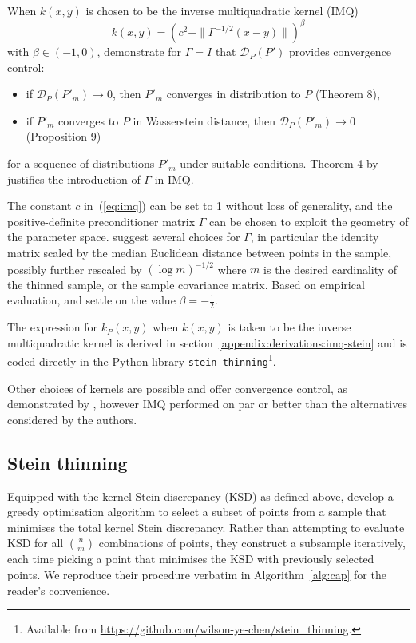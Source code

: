 \documentclass[11pt,a4paper]{report}
\begin{document}
When $k(x, y)$ is chosen to be the inverse multiquadratic kernel (IMQ)
\begin{equation}
k(x, y) = \left(c^2 + \|\Gamma^{-1/2}(x-y)\|\right)^\beta
\label{eq:imq}
\end{equation}
with $\beta \in (-1, 0)$, \cite{gorhamMeasuringSampleQuality2017} demonstrate for $\Gamma = I$ that $\mathcal{D}_{P}(P')$ provides convergence control:
\begin{itemize}
\item if $\mathcal{D}_{P}(P'_m) \to 0$, then $P'_m$ converges in distribution to $P$ (Theorem 8),
\item if $P'_m$ converges to $P$ in Wasserstein distance, then $\mathcal{D}_{P}(P'_m) \to 0$ (Proposition 9)
\end{itemize}
for a sequence of distributions $P'_m$ under suitable conditions. Theorem 4 by \cite{chenSteinPointMarkov2019} justifies the introduction of $\Gamma$ in IMQ.

The constant $c$ in~(\ref{eq:imq}) can be set to 1 without loss of generality, and the positive-definite preconditioner matrix $\Gamma$ can be chosen to exploit the geometry of the parameter space. \cite{riabizOptimalThinningMCMC2022} suggest several choices for $\Gamma$, in particular the identity matrix scaled by the median Euclidean distance between points in the sample, possibly further rescaled by $(\log m)^{-1/2}$ where $m$ is the desired cardinality of the thinned sample, or the sample covariance matrix. Based on empirical evaluation, \cite{gorhamMeasuringSampleQuality2017} and \cite{riabizOptimalThinningMCMC2022} settle on the value $\beta = -\frac12$.

The expression for $k_P(x, y)$ when $k(x, y)$ is taken to be the inverse multiquadratic kernel is derived in section~\ref{appendix:derivations:imq-stein} and is coded directly in the Python library \texttt{stein-thinning}\footnote{Available from \url{https://github.com/wilson-ye-chen/stein_thinning}.}.

Other choices of kernels are possible and offer convergence control, as demonstrated by \cite{chenSteinPoints2018}, however IMQ performed on par or better than the alternatives considered by the authors.

\subsection{Stein thinning}
\label{sec:stein-thinning}

Equipped with the kernel Stein discrepancy (KSD) as defined above, \cite{riabizOptimalThinningMCMC2022} develop a greedy optimisation algorithm to select a subset of points from a sample that minimises the total kernel Stein discrepancy. Rather than attempting to evaluate KSD for all $n \choose m$ combinations of points, they construct a subsample iteratively, each time picking a point that minimises the KSD with previously selected points. We reproduce their procedure verbatim in Algorithm~\ref{alg:cap} for the reader's convenience. 
\end{document}
